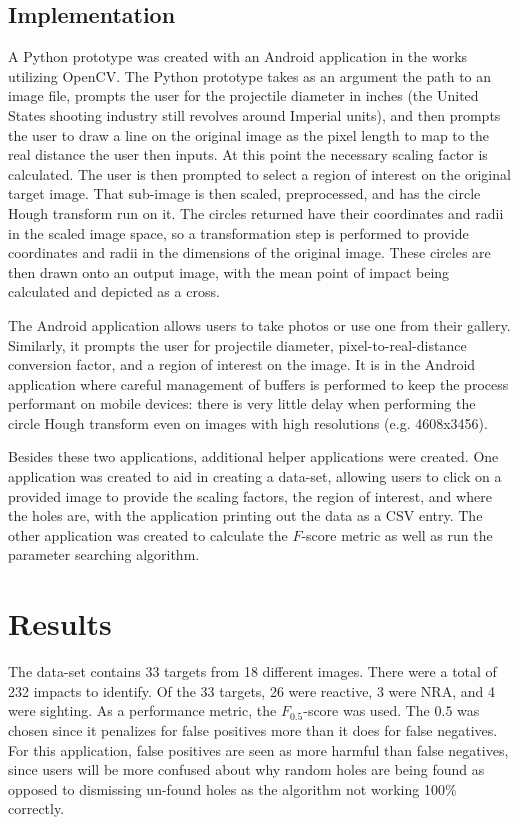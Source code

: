 \documentclass{article}
\begin{document}
\subsection{Implementation}
\label{ssec:implementation}

A Python prototype was created with an Android application in the works utilizing OpenCV.
The Python prototype takes as an argument the path to an image file, prompts
the user for the projectile diameter in inches (the United States shooting industry
still revolves around Imperial units), and then prompts the user to draw a line
on the original image as the pixel length to map to the real distance the user then inputs.
At this point the necessary scaling factor is calculated.
The user is then prompted to select a region of interest on the original target image.
That sub-image is then scaled, preprocessed, and has the circle Hough transform run on it.
The circles returned have their coordinates and radii in the scaled image space, so a
transformation step is performed to provide coordinates and radii in the dimensions of
the original image. These circles are then drawn onto an output image, with the mean
point of impact being calculated and depicted as a cross.

The Android application allows users to take photos or use one from their gallery. Similarly,
it prompts the user for projectile diameter, pixel-to-real-distance conversion factor, and
a region of interest on the image. It is in the Android application where careful management
of buffers is performed to keep the process performant on mobile devices:
there is very little delay when performing the circle Hough transform even on
images with high resolutions (e.g. 4608x3456).

Besides these two applications, additional helper applications were created. One application
was created to aid in creating a data-set, allowing users to click on a provided image
to provide the scaling factors, the region of interest, and where the holes are, with the application
printing out the data as a CSV entry. The other application was created to calculate the \(F\)-score
metric as well as run the parameter searching algorithm.

\section{Results}
\label{sec:results}

The data-set contains 33 targets from 18 different images. There were a total of 232 impacts
to identify. Of the 33 targets, 26 were reactive, 3 were NRA, and 4 were sighting.
As a performance metric, the \(F_{0.5}\)-score was used. The \(0.5\) was chosen
since it penalizes for false positives more than it does for false negatives.
For this application, false positives are seen as more harmful than false negatives, since users
will be more confused about why random holes are being found as opposed to dismissing un-found
holes as the algorithm not working 100\% correctly.
\end{document}
